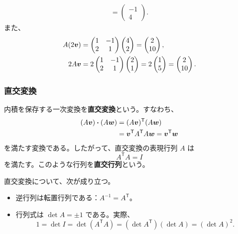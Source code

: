 \begin{example}
\begin{align*}
 =\begin{pmatrix}-1\\4\end{pmatrix}.
\end{align*}
また、
\begin{align*}
 A(2\bm{v})
 &=\begin{pmatrix}1&-1\\2&1\end{pmatrix}\begin{pmatrix}4\\2\end{pmatrix}
 =\begin{pmatrix}2\\10\end{pmatrix},\\
 2A\bm{v}
 &=2\begin{pmatrix}1&-1\\2&1\end{pmatrix}\begin{pmatrix}2\\1\end{pmatrix}
 =2\begin{pmatrix}1\\5\end{pmatrix}
 =\begin{pmatrix}2\\10\end{pmatrix}.
\end{align*}
\end{example}

\subsubsection{直交変換}

内積を保存する一次変換を\textbf{直交変換}という。すなわち、
\begin{align}
 (A\bm{v})\mathbin{\boldsymbol{\cdot}}(A\bm{w})
 &=(A\bm{v})^{\mathsf T}(A\bm{w})\notag\\
 &=\bm{v}^{\mathsf T}A^{\mathsf T}A\bm{w}
 =\bm{v}^{\mathsf T}\bm{w}
\end{align}
を満たす変換である。したがって、直交変換の表現行列 $A$ は
\begin{equation}
 \boxed{A^{\mathsf T}A=I}
\end{equation}
を満たす。このような行列を\textbf{直交行列}という。

直交変換について、次が成り立つ。
\begin{itemize}
 \item 逆行列は転置行列である：$A^{-1}=A^{\mathsf T}$。
 \item 行列式は $\det A=\pm1$ である。実際、
 \[
  1=\det I=\det(A^{\mathsf T}A)
   =(\det A^{\mathsf T})(\det A)=(\det A)^2.
 \]
\end{itemize}

